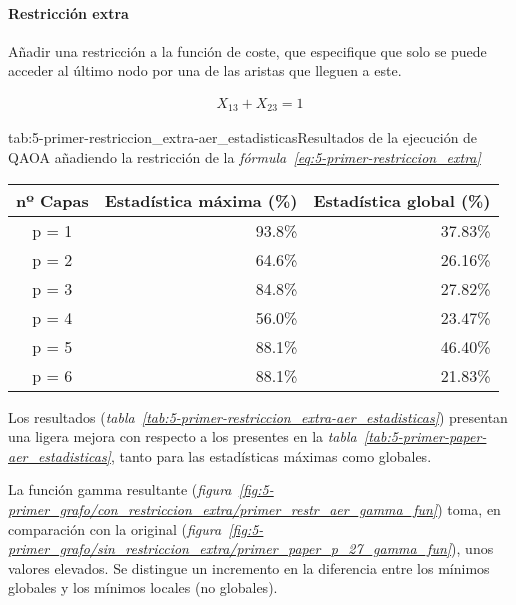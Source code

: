 \paragraph{Restricción extra}
Añadir una restricción a la función de coste, que especifique que solo se puede acceder al último nodo por una de las aristas que lleguen a este.

\begin{align}\label{eq:5-primer-restriccion_extra}
  X_{13} + X_{23} = 1
\end{align}

\begin{table}[htbp]{tab:5-primer-restriccion_extra-aer_estadisticas}{Resultados de la ejecución de QAOA añadiendo la restricción de la \textit{fórmula~\ref{eq:5-primer-restriccion_extra}}}
  \centering
  \begin{tabular}{|c|r|r|}
    \hline
    \textbf{nº Capas} & \textbf{Estadística máxima (\%)} & \textbf{Estadística global (\%)} \\ \hline
    p = 1             & 93.8\%                           & 37.83\%                          \\ \hline
    p = 2             & 64.6\%                           & 26.16\%                          \\ \hline
    p = 3             & 84.8\%                           & 27.82\%                          \\ \hline
    p = 4             & 56.0\%                           & 23.47\%                          \\ \hline
    p = 5             & 88.1\%                           & 46.40\%                          \\ \hline
    p = 6             & 88.1\%                           & 21.83\%                          \\ \hline
  \end{tabular}
\end{table}

Los resultados (\textit{tabla~\ref{tab:5-primer-restriccion_extra-aer_estadisticas}}) presentan una ligera mejora con respecto a los presentes en la \textit{tabla~\ref{tab:5-primer-paper-aer_estadisticas}}, tanto para las estadísticas máximas como globales.

La función gamma resultante (\textit{figura~\ref{fig:5-primer_grafo/con_restriccion_extra/primer_restr_aer_gamma_fun}}) toma, en comparación con la original (\textit{figura~\ref{fig:5-primer_grafo/sin_restriccion_extra/primer_paper_p_27_gamma_fun}}), unos valores elevados.
Se distingue un incremento en la diferencia entre los mínimos globales y los mínimos locales (no globales).

